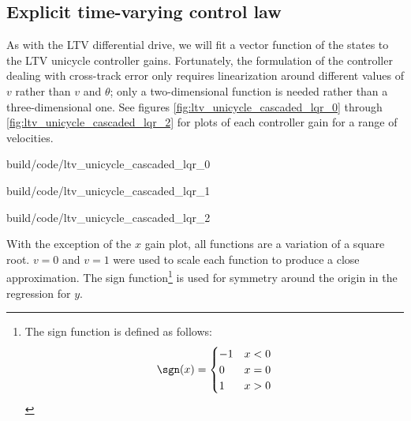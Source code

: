 \subsection{Explicit time-varying control law}

As with the LTV differential drive, we will fit a vector function of the states
to the LTV unicycle controller gains. Fortunately, the formulation of the
controller dealing with cross-track error only requires linearization around
different values of $v$ rather than $v$ and $\theta$; only a two-dimensional
function is needed rather than a three-dimensional one. See figures
\ref{fig:ltv_unicycle_cascaded_lqr_0} through
\ref{fig:ltv_unicycle_cascaded_lqr_2} for plots of each controller gain for a
range of velocities.

\begin{bookfigure}
  \begin{minisvg}{2}{build/code/ltv_unicycle_cascaded_lqr_0}
    \caption{Linear time-varying unicycle controller cascaded LQR gain
      regression ($x$)}
    \label{fig:ltv_unicycle_cascaded_lqr_0}
  \end{minisvg}
  \hfill
  \begin{minisvg}{2}{build/code/ltv_unicycle_cascaded_lqr_1}
    \caption{Linear time-varying unicycle controller cascaded LQR gain
      regression ($y$)}
  \end{minisvg}
  \hfill
  \begin{minisvg}{2}{build/code/ltv_unicycle_cascaded_lqr_2}
    \caption{Linear time-varying unicycle controller cascaded LQR gain
      regression ($\theta$)}
    \label{fig:ltv_unicycle_cascaded_lqr_2}
  \end{minisvg}
\end{bookfigure}

With the exception of the $x$ gain plot, all functions are a variation of a
square root. $v = 0$ and $v = 1$ were used to scale each function to produce a
close approximation. The sign function\footnote{The sign function is defined as
follows:
\begin{equation*}
  \sgn(x) = \begin{cases}
    -1 & x < 0 \\
    0 & x = 0 \\
    1 & x > 0
  \end{cases}
\end{equation*}} is used for symmetry around the origin in the regression for
$y$.

